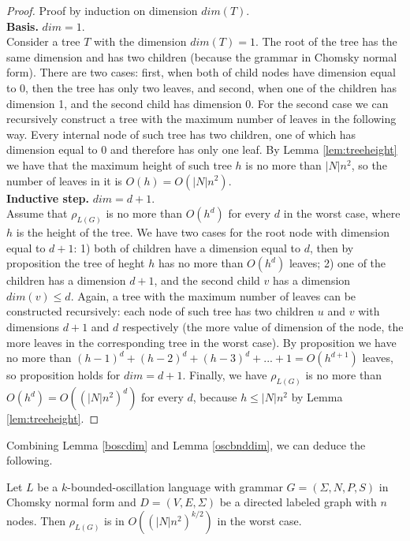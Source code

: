 \begin{proof}
Proof by induction on dimension $dim(T)$.
\\
\textbf{Basis.} $dim = 1$.
\\
Consider a tree $T$ with the dimension $dim(T) = 1$. The root of the tree has the same dimension and has two children (because the grammar in Chomsky normal form). There are two cases:  first, when both of child nodes have dimension equal to 0, then the tree has only two leaves, and second, when one of the children has dimension 1, and the second child has dimension 0. For the second case we can recursively construct a tree with the maximum number of leaves in the following way. Every internal node of such tree has two children, one of which has dimension equal to 0 and therefore has only one leaf. By Lemma \ref{lem:treeheight} we have that the maximum height of such tree $h$ is no more than $|N|n^2$, so the number of leaves in it is $O(h) = O(|N|n^2)$.
\\
\textbf{Inductive step.} $dim = d + 1$.
\\
Assume that $\rho_{L(G)}$ is no more than $O(h^{d})$ for every $d$ in the worst case, where $h$ is the height of the tree. We have two cases for the root node with dimension equal to $d+1$: 1) both of children have a dimension equal to $d$, then by proposition the tree of heght $h$ has no more than $O(h^{d})$ leaves; 2) one of the children has a dimension $d + 1$, and the second child $v$ has a dimension $dim(v) \le d$. Again, a tree with the maximum number of leaves can be constructed recursively:  each node of such tree has two children $u$ and $v$ with dimensions $d+1$ and $d$ respectively (the more value of dimension of the node, the more leaves in the corresponding tree in the worst case). By proposition we have no more than $(h-1)^d + (h-2)^d + (h-3)^d + ... + 1 = O(h^{d+1})$ leaves, so proposition holds for $dim = d+1$. Finally, we have $\rho_{L(G)}$ is no more than $O(h^{d}) = O({(|N|n^2)}^d)$ for every $d$, because $h \le |N|n^2$ by Lemma \ref{lem:treeheight}. 
\end{proof}
Combining Lemma \ref{boscdim} and Lemma \ref{oscbnddim}, we can deduce the following.
\begin{theorem}
\label{oscbndosc}
Let $L$ be a $k$-bounded-oscillation language with grammar $G = (\Sigma, N, P, S)$ in Chomsky normal form and $D=(V, E, \Sigma)$ be a directed labeled graph with $n$ nodes. Then $\rho_{L(G)}$ is in $O((|N|n^2)^{k/2})$ in the worst case.
\end{theorem}

